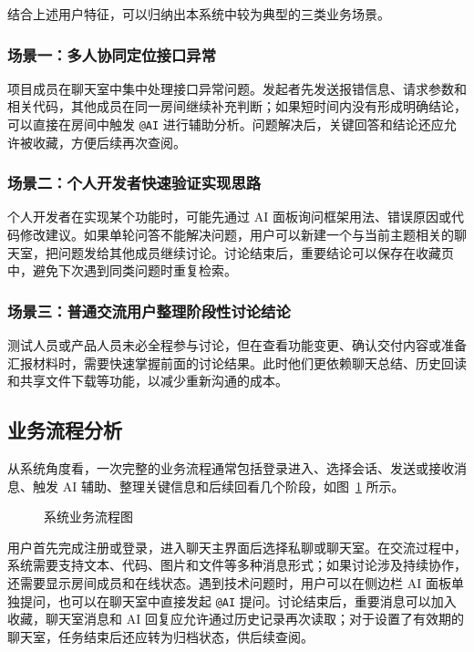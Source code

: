结合上述用户特征，可以归纳出本系统中较为典型的三类业务场景。

\subsubsection{场景一：多人协同定位接口异常}

项目成员在聊天室中集中处理接口异常问题。发起者先发送报错信息、请求参数和相关代码，其他成员在同一房间继续补充判断；如果短时间内没有形成明确结论，可以直接在房间中触发 \texttt{@AI} 进行辅助分析。问题解决后，关键回答和结论还应允许被收藏，方便后续再次查阅。

\subsubsection{场景二：个人开发者快速验证实现思路}

个人开发者在实现某个功能时，可能先通过 AI 面板询问框架用法、错误原因或代码修改建议。如果单轮问答不能解决问题，用户可以新建一个与当前主题相关的聊天室，把问题发给其他成员继续讨论。讨论结束后，重要结论可以保存在收藏页中，避免下次遇到同类问题时重复检索。

\subsubsection{场景三：普通交流用户整理阶段性讨论结论}

测试人员或产品人员未必全程参与讨论，但在查看功能变更、确认交付内容或准备汇报材料时，需要快速掌握前面的讨论结果。此时他们更依赖聊天总结、历史回读和共享文件下载等功能，以减少重新沟通的成本。

\subsection{业务流程分析}

从系统角度看，一次完整的业务流程通常包括登录进入、选择会话、发送或接收消息、触发 AI 辅助、整理关键信息和后续回看几个阶段，如图~\ref{fig:3-2} 所示。

\begin{figure}[H]
\centering
{}
\caption{系统业务流程图}
\label{fig:3-2}
\end{figure}

用户首先完成注册或登录，进入聊天主界面后选择私聊或聊天室。在交流过程中，系统需要支持文本、代码、图片和文件等多种消息形式；如果讨论涉及持续协作，还需要显示房间成员和在线状态。遇到技术问题时，用户可以在侧边栏 AI 面板单独提问，也可以在聊天室中直接发起 \texttt{@AI} 提问。讨论结束后，重要消息可以加入收藏，聊天室消息和 AI 回复应允许通过历史记录再次读取；对于设置了有效期的聊天室，任务结束后还应转为归档状态，供后续查阅。

